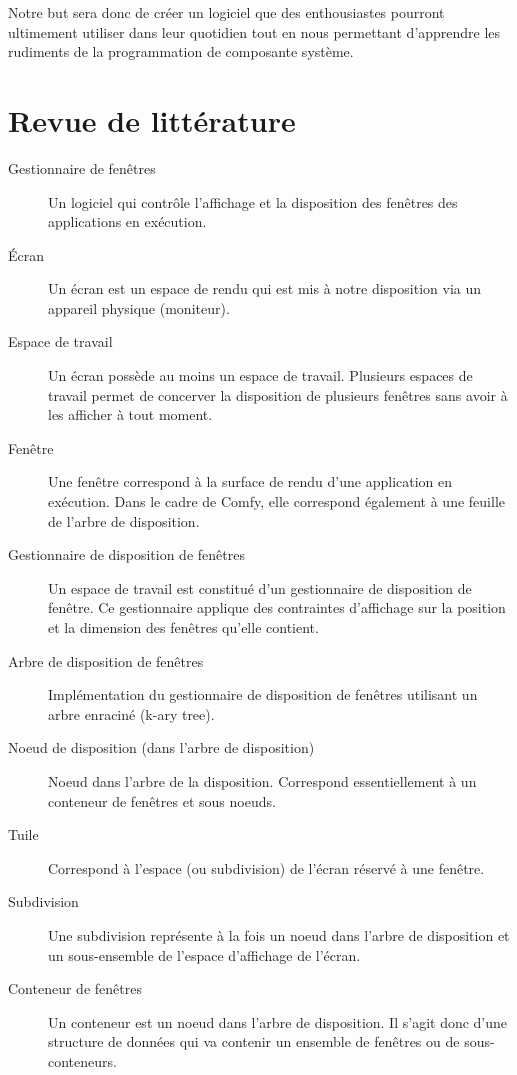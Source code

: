 \documentclass[titlepage]{article}
\begin{document}
\par
Notre but sera donc de créer un logiciel que des enthousiastes pourront
ultimement utiliser dans leur quotidien tout en nous permettant d’apprendre les
rudiments de la programmation de composante système.
\bigskip

\section{Revue de littérature}
\begin{description}
	\item [Gestionnaire de fenêtres]
		Un logiciel qui contrôle l’affichage et la disposition des fenêtres des
		applications en exécution.
	\item [Écran]
		Un écran est un espace de rendu qui est mis à notre disposition via un
		appareil physique (moniteur).
	\item [Espace de travail]
		Un écran possède au moins un espace de travail. Plusieurs espaces de travail
		permet de concerver la disposition de plusieurs fenêtres sans avoir à les
		afficher à tout moment.
	\item [Fenêtre]
		Une fenêtre correspond à la surface de rendu d’une application en exécution.
		Dans le cadre de Comfy, elle correspond également à une feuille de l'arbre
		de disposition.
	\item [Gestionnaire de disposition de fenêtres]
		Un espace de travail est constitué d’un gestionnaire de disposition de
		fenêtre. Ce gestionnaire applique des contraintes d'affichage sur la
		position et la dimension des fenêtres qu'elle contient.
	\item [Arbre de disposition de fenêtres]
		Implémentation du gestionnaire de disposition de fenêtres utilisant un arbre
		enraciné (k-ary tree).
	\item [Noeud de disposition (dans l’arbre de disposition)]
		Noeud dans l’arbre de la disposition. Correspond essentiellement à un
		conteneur de fenêtres et sous noeuds.
	\item [Tuile]
		Correspond à l’espace (ou subdivision) de l’écran réservé à une fenêtre.
	\item [Subdivision]
		Une subdivision représente à la fois un noeud dans l’arbre de disposition et
		un sous-ensemble de l’espace d’affichage de l’écran.
	\item [Conteneur de fenêtres]
		Un conteneur est un noeud dans l’arbre de disposition. Il s’agit donc d’une
		structure de données qui va contenir un ensemble de fenêtres ou de
		sous-conteneurs.

\end{description}
\end{document}
